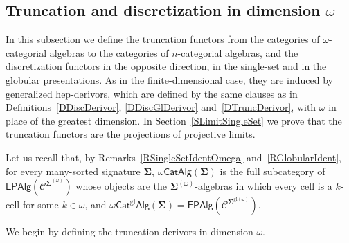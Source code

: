 \documentclass[a4paper, reqno
]{amsart}
\newcommand{\sig}[1]{\mathbf{#1}}             %
\newcommand{\spec}[1]{\boldsymbol{\mathcal{#1}}} %
\newcommand{\gl}{\mathrm{gl}}                %
\theoremstyle{plain}
\theoremstyle{definition}
\begin{document}
\subsection{Truncation and discretization in dimension \texorpdfstring{$\omega$}{omega}}\label{SDTOmega}

In this subsection we define the truncation functors from the categories of $\omega$-categorial algebras to the categories of $n$-categorial algebras, and the discretization functors in the opposite direction, in the single-set and in the globular presentations.
As in the finite-dimensional case, they are induced by generalized hep-derivors, which are defined by the same clauses as in Definitions~\ref{DDiscDerivor}, \ref{DDiscGlDerivor} and~\ref{DTruncDerivor}, with $\omega$ in place of the greatest dimension.
In Section~\ref{SLimitSingleSet} we prove that the truncation functors are the projections of projective limits.

Let us recall that, by Remarks~\ref{RSingleSetIdentOmega} and~\ref{RGlobularIdent}, for every many-sorted signature $\sig{\Sigma}$, $\omega\mathsf{CatAlg}(\sig{\Sigma})$ is the full subcategory of $\mathsf{EPAlg}(\spec{C}^{\sig{\Sigma}^{(\omega)}})$ whose objects are the $\sig{\Sigma}^{(\omega)}$-algebras in which every cell is a $k$-cell for some $k\in\omega$, and $\omega\mathsf{Cat}^{\gl}\mathsf{Alg}(\sig{\Sigma})=\mathsf{EPAlg}(\spec{C}^{\sig{\Sigma}^{\gl(\omega)}})$.

We begin by defining the truncation derivors in dimension $\omega$.
\end{document}
